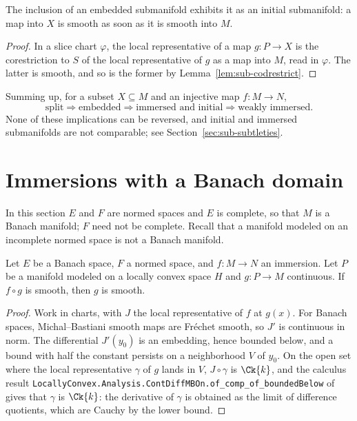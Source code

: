 \begin{theorem}
  \label{thm:sub-inclusion-initial}
  \leanok
  The inclusion of an embedded submanifold exhibits it as an initial submanifold: a map into
  $X$ is smooth as soon as it is smooth into $M$.
\end{theorem}

\begin{proof}
  \leanok
  In a slice chart $\varphi$, the local representative of a map $g \colon P \to X$ is the
  corestriction to $S$ of the local representative of $g$ as a map into $M$, read in
  $\varphi$. The latter is smooth, and so is the former by Lemma~\ref{lem:sub-codrestrict}.
\end{proof}

Summing up, for a subset $X \subseteq M$ and an injective map $f \colon M \to N$,
\[
  \text{split} \Rightarrow \text{embedded} \Rightarrow
  \text{immersed and initial} \Rightarrow \text{weakly immersed}.
\]
None of these implications can be reversed, and initial and immersed submanifolds are not
comparable; see Section~\ref{sec:sub-subtleties}.

\section{Immersions with a Banach domain}

In this section $E$ and $F$ are normed spaces and $E$ is complete, so that $M$ is a Banach
manifold; $F$ need not be complete. Recall that a manifold modeled on an incomplete normed space
is not a Banach manifold.

\begin{theorem}
  \label{thm:sub-banach-reflect}
  \leanok
  Let $E$ be a Banach space, $F$ a normed space, and $f \colon M \to N$ an immersion. Let $P$
  be a manifold modeled on a locally convex space $H$ and $g \colon P \to M$ continuous. If
  $f \circ g$ is smooth, then $g$ is smooth.
\end{theorem}

\begin{proof}
  \leanok
  Work in charts, with $J$ the local representative of $f$ at $g(x)$. For Banach spaces,
  Michal--Bastiani smooth maps are Fréchet smooth, so $J'$ is continuous in norm. The
  differential $J'(y_0)$ is an embedding, hence bounded below, and a bound with half the
  constant persists on a neighborhood $V$ of $y_0$. On the open set where the local
  representative $\gamma$ of $g$ lands in $V$, $J \circ \gamma$ is $\Ck{k}$, and the calculus
  result \texttt{LocallyConvex.Analysis.ContDiffMBOn.of\_comp\_of\_boundedBelow} of \cite{LCA} gives that
  $\gamma$ is $\Ck{k}$: the derivative of $\gamma$ is obtained as the limit of difference
  quotients, which are Cauchy by the lower bound.
\end{proof}

